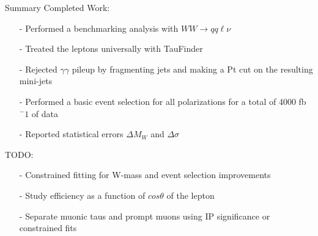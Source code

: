 \documentclass[10pt]{beamer}
\begin{document}
\begin{frame}{Summary}
Completed Work:
\begin{itemize}
	\item[-] Performed a benchmarking analysis with $WW\rightarrow qq\ell\nu$
	\item[-] Treated the leptons universally with TauFinder
	\item[-] Rejected $\gamma \gamma$ pileup by fragmenting jets and making a Pt cut on the resulting mini-jets
	\item[-] Performed a basic event selection for all polarizations for a total of 4000 fb$^-1$ of data
	\item[-] Reported statistical errors $\Delta M_W$ and $\Delta\sigma$
	
\end{itemize}
TODO:
\begin{itemize}
	\item[-] Constrained fitting for W-mass and event selection improvements
	\item[-] Study efficiency as a function of $cos\theta$ of the lepton 
	\item[-] Separate muonic taus and prompt muons using IP significance or constrained fits

\end{itemize}

\end{frame}
\end{document}

